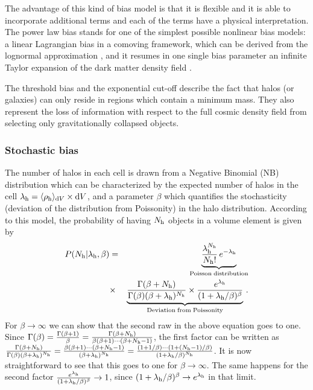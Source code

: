 \documentclass[english,usenatbib]{mn2e}
\newcommand{\tod}[1]{{\textcolor{red}{ #1}}}
\newcommand{\ba}{\begin{eqnarray}}
\newcommand{\ea}{\end{eqnarray}}
\begin{document}
The advantage of this kind of bias model is that it is flexible and it is able to incorporate additional terms and each of the terms have a physical interpretation.
The power law bias stands for one of the simplest possible nonlinear bias models: a linear Lagrangian bias in a comoving framework, which can be derived from the lognormal approximation \tod{\citep[see][]{kitaura2014}}, and it resumes in one single bias parameter an infinite Taylor expansion of the dark matter density field \citep{cen1993,fry1993,delatorre}.

The threshold bias and the exponential cut-off describe the fact that halos (or galaxies) can only reside in regions which contain a minimum mass. They also represent the loss of information with respect to the full cosmic density field from selecting only gravitationally collapsed objects.


\subsubsection{Stochastic bias}

The number of halos in each cell is drawn from a Negative Binomial (NB) distribution which can be characterized by the expected number of halos in the cell $\lambda_{\rm h} = \langle \rho_{\rm h} \rangle_{{\rm d}V} \times {\rm d}V$, and a parameter $\beta$ which quantifies the stochasticity (deviation of the distribution from Poissonity) in the halo distribution. According to this model, the probability of having $N_{\rm h}$ objects in a volume element is given by
\ba
P(N_{\rm h}|\lambda_{\rm h}, \beta) &=& \underbrace{\frac{\lambda_{\rm h}^{N_{\rm h}}}{N_{\rm h}!}\, e^{-\lambda_{\rm h}}}_{\mathrm{Poisson\; distribution}} \nonumber \\ 
&\times& \underbrace{\frac{\Gamma(\beta+N_{\rm h})}{\Gamma(\beta)(\beta + \lambda_{\rm h})^{N_{\rm h}}}\times\frac{e^{\lambda_{\rm h}}}{(1+\lambda_{\rm h}/\beta)^{\beta}}}_{\mathrm{Deviation\; from\; Poissonity}}\,.
\label{eq:devpois}
\ea
For $\beta\rightarrow\infty$ we can show that the second raw in the above equation goes to one. Since $\Gamma(\beta)=\frac{\Gamma(\beta+1)}{\beta}=\frac{\Gamma(\beta+N_{\rm h})}{\beta(\beta+1)\cdots(\beta+N_{\rm h}-1)}$, the first factor can be written as $\frac{\Gamma(\beta+N_{\rm h})}{\Gamma(\beta)(\beta + \lambda_{\rm h})^{N_{\rm h}}}=\frac{\beta(\beta+1)\cdots(\beta+N_{\rm h}-1)}{(\beta + \lambda_{\rm h})^{N_{\rm h}}}=\frac{(1+1/\beta)\cdots(1+(N_{\rm h}-1)/\beta)}{(1 + \lambda_{\rm h}/\beta)^{N_{\rm h}}}$. It is now straightforward to see that this goes to one for $\beta\rightarrow\infty$. The same happens for the second factor $\frac{e^{\lambda_{\rm h}}}{(1+\lambda_{\rm h}/\beta)^{\beta}}\rightarrow 1$, since $(1+\lambda_{\rm h}/\beta)^{\beta}\rightarrow e^{\lambda_{\rm h}}$ in that limit.
\end{document}
